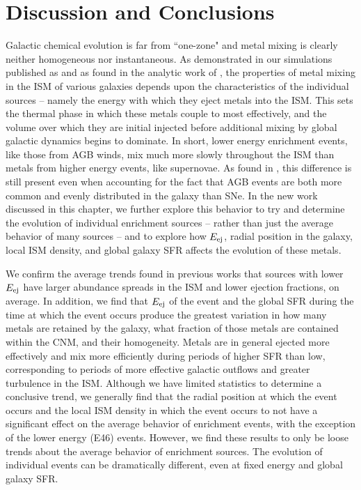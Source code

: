 \section{Discussion and Conclusions}

Galactic chemical evolution is far from ``one-zone" and metal mixing is clearly neither homogeneous nor instantaneous. As demonstrated in our simulations published as \cite{Emerick2018b} and as found in the analytic work of \cite{KrumholzTing2018}, the properties of metal mixing in the ISM of various galaxies depends upon the characteristics of the individual sources -- namely the energy with which they eject metals into the ISM. This sets the thermal phase in which these metals couple to most effectively, and the volume over which they are initial injected before additional mixing by global galactic dynamics begins to dominate. In short, lower energy enrichment events, like those from AGB winds, mix much more slowly throughout the ISM than metals from higher energy events, like supernovae. As found in \cite{Emerick2018b}, this difference is still present even when accounting for the fact that AGB events are both more common and evenly distributed in the galaxy than SNe. In the new work discussed in this chapter, we further explore this behavior to try and determine the evolution of individual enrichment sources -- rather than just the average behavior of many sources -- and to explore how $E_{\rm ej}$, radial position in the galaxy, local ISM density, and global galaxy SFR affects the evolution of these metals.

We confirm the average trends found in previous works that sources with lower $E_{\rm ej}$ have larger abundance spreads in the ISM and lower ejection fractions, on average. In addition, we find that $E_{\rm ej}$ of the event and the global SFR during the time at which the event occurs produce the greatest variation in how many metals are retained by the galaxy, what fraction of those metals are contained within the CNM, and their homogeneity. Metals are in general ejected more effectively and mix more efficiently during periods of higher SFR than low, corresponding to periods of more effective galactic outflows and greater turbulence in the ISM. Although we have limited statistics to determine a conclusive trend, we generally find that the radial position at which the event occurs and the local ISM density in which the event occurs to not have a significant effect on the average behavior of enrichment events, with the exception of the lower energy (E46) events. However, we find these results to only be loose trends about the average behavior of enrichment sources. The evolution of individual events can be dramatically different, even at fixed energy and global galaxy SFR.

